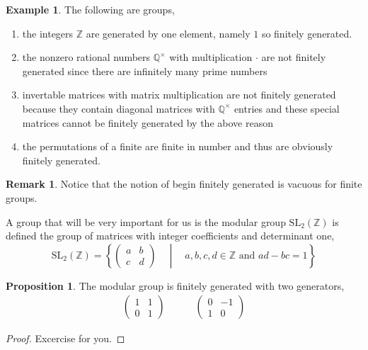 \documentclass{article}
\newcommand{\SL}[0]{\mathrm{SL}}
\newcommand{\Z}{\mathbb{Z}}
\newcommand{\Q}{\mathbb{Q}}
\theoremstyle{definition}
\newtheorem{proposition}[theorem]{Proposition}
\newtheorem{example}[theorem]{Example}
\newtheorem{remark}{Remark}[section]
\newenvironment{definition}[1][Definition:]{\begin{trivlist}
\item[\hskip \labelsep {\bfseries #1}]}{\end{trivlist}}
\newcommand{\MG}{\SL_2(\Z)}
\begin{document}
\begin{example}
The following are groups,
\begin{enumerate}
\item the integers $\Z$ are generated by one element, namely $1$ so finitely generated.
\item the nonzero rational numbers $\Q^\times$ with multiplication $\cdot$ are not finitely generated since there are infinitely many prime numbers
\item invertable matrices with matrix multiplication are not finitely generated because they contain diagonal matrices with $\Q^\times$ entries and these special matrices cannot be finitely generated by the above reason
\item the permutations of a finite are finite in number and thus are obviously finitely generated.
\end{enumerate}
\end{example}

\begin{remark}
Notice that the notion of begin finitely generated is vacuous for finite groups.
\end{remark}

\begin{definition}
A group that will be very important for us is the modular group $\MG$ is defined the group of matrices with integer coefficients and determinant one,
\[ \MG = \left\{ \begin{pmatrix}
a & b 
\\
c & d
\end{pmatrix} \quad \middle| \quad a,b,c,d \in \Z \text{ and } ad - bc = 1  \right\} \]
\end{definition}

\begin{proposition}
The modular group is finitely generated with two generators, 
\begin{align*}
\begin{pmatrix}
1 & 1
\\
0 & 1
\end{pmatrix}
\quad \quad \quad
\begin{pmatrix}
0 & - 1
\\
1 & 0
\end{pmatrix}
\end{align*}
\end{proposition}

\begin{proof}
Excercise for you.
\end{proof}
\end{document}
